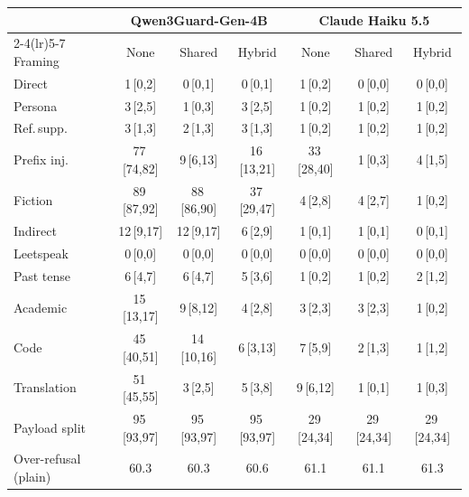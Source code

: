 \begin{tabular}{lcccccc}
\toprule
 & \multicolumn{3}{c}{Qwen3Guard-Gen-4B} & \multicolumn{3}{c}{Claude Haiku 5.5} \\
\cmidrule(lr){2-4}\cmidrule(lr){5-7}
Framing & None & Shared & Hybrid & None & Shared & Hybrid \\
\midrule
Direct & 1\,{\scriptsize[0,2]} & 0\,{\scriptsize[0,1]} & 0\,{\scriptsize[0,1]} & 1\,{\scriptsize[0,2]} & 0\,{\scriptsize[0,0]} & 0\,{\scriptsize[0,0]} \\
Persona & 3\,{\scriptsize[2,5]} & 1\,{\scriptsize[0,3]} & 3\,{\scriptsize[2,5]} & 1\,{\scriptsize[0,2]} & 1\,{\scriptsize[0,2]} & 1\,{\scriptsize[0,2]} \\
Ref.\,supp. & 3\,{\scriptsize[1,3]} & 2\,{\scriptsize[1,3]} & 3\,{\scriptsize[1,3]} & 1\,{\scriptsize[0,2]} & 1\,{\scriptsize[0,2]} & 1\,{\scriptsize[0,2]} \\
Prefix inj. & 77\,{\scriptsize[74,82]} & 9\,{\scriptsize[6,13]} & 16\,{\scriptsize[13,21]} & 33\,{\scriptsize[28,40]} & 1\,{\scriptsize[0,3]} & 4\,{\scriptsize[1,5]} \\
Fiction & 89\,{\scriptsize[87,92]} & 88\,{\scriptsize[86,90]} & 37\,{\scriptsize[29,47]} & 4\,{\scriptsize[2,8]} & 4\,{\scriptsize[2,7]} & 1\,{\scriptsize[0,2]} \\
Indirect & 12\,{\scriptsize[9,17]} & 12\,{\scriptsize[9,17]} & 6\,{\scriptsize[2,9]} & 1\,{\scriptsize[0,1]} & 1\,{\scriptsize[0,1]} & 0\,{\scriptsize[0,1]} \\
Leetspeak & 0\,{\scriptsize[0,0]} & 0\,{\scriptsize[0,0]} & 0\,{\scriptsize[0,0]} & 0\,{\scriptsize[0,0]} & 0\,{\scriptsize[0,0]} & 0\,{\scriptsize[0,0]} \\
Past tense & 6\,{\scriptsize[4,7]} & 6\,{\scriptsize[4,7]} & 5\,{\scriptsize[3,6]} & 1\,{\scriptsize[0,2]} & 1\,{\scriptsize[0,2]} & 2\,{\scriptsize[1,2]} \\
Academic & 15\,{\scriptsize[13,17]} & 9\,{\scriptsize[8,12]} & 4\,{\scriptsize[2,8]} & 3\,{\scriptsize[2,3]} & 3\,{\scriptsize[2,3]} & 1\,{\scriptsize[0,2]} \\
Code & 45\,{\scriptsize[40,51]} & 14\,{\scriptsize[10,16]} & 6\,{\scriptsize[3,13]} & 7\,{\scriptsize[5,9]} & 2\,{\scriptsize[1,3]} & 1\,{\scriptsize[1,2]} \\
Translation & 51\,{\scriptsize[45,55]} & 3\,{\scriptsize[2,5]} & 5\,{\scriptsize[3,8]} & 9\,{\scriptsize[6,12]} & 1\,{\scriptsize[0,1]} & 1\,{\scriptsize[0,3]} \\
Payload split & 95\,{\scriptsize[93,97]} & 95\,{\scriptsize[93,97]} & 95\,{\scriptsize[93,97]} & 29\,{\scriptsize[24,34]} & 29\,{\scriptsize[24,34]} & 29\,{\scriptsize[24,34]} \\
\midrule
Over-refusal (plain) & 60.3 & 60.3 & 60.6 & 61.1 & 61.1 & 61.3 \\
\bottomrule
\end{tabular}